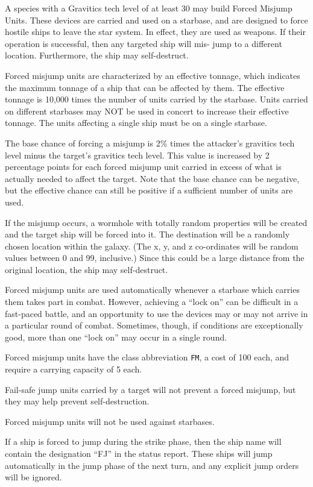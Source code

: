 \documentclass[10pt,titlepage]{article}
\begin{document}
A species with a Gravitics tech level of at least 30 may build Forced Misjump
Units.  These devices are carried and used on a starbase, and are designed to
force hostile ships to leave the star system.  In effect, they are used as
weapons.  If their operation is successful, then any targeted ship will mis-
jump to a different location.  Furthermore, the ship may self-destruct.

Forced misjump units are characterized by an effective tonnage, which indicates
the maximum tonnage of a ship that can be affected by them.  The effective
tonnage is 10,000 times the number of units carried by the starbase.  Units
carried on different starbases may NOT be used in concert to increase their
effective tonnage.  The units affecting a single ship must be on a single
starbase.

The base chance of forcing a misjump is 2\% times the attacker's gravitics tech
level minus the target's gravitics tech level.  This value is increased by 2
percentage points for each forced misjump unit carried in excess of what is
actually needed to affect the target.  Note that the base chance can be
negative, but the effective chance can still be positive if a sufficient
number of units are used.

If the misjump occurs, a wormhole with totally random properties will be
created and the target ship will be forced into it.  The destination will be
a randomly chosen location within the galaxy.  (The x, y, and z co-ordinates
will be random values between 0 and 99, inclusive.)  Since this could be a
large distance from the original location, the ship may self-destruct.

Forced misjump units are used automatically whenever a starbase which carries
them takes part in combat.  However, achieving a ``lock on'' can be difficult
in a fast-paced battle, and an opportunity to use the devices may or may not
arrive in a particular round of combat.  Sometimes, though, if conditions are
exceptionally good, more than one ``lock on'' may occur in a single round.

Forced misjump units have the class abbreviation \texttt{FM}, a cost of 100 each, and
require a carrying capacity of 5 each.

Fail-safe jump units carried by a target will not prevent a forced misjump,
but they may help prevent self-destruction.

Forced misjump units will not be used against starbases.

If a ship is forced to jump during the strike phase, then the ship name will
contain the designation ``FJ'' in the status report.  These ships will jump
automatically in the jump phase of the next turn, and any explicit jump orders
will be ignored.
\end{document}
